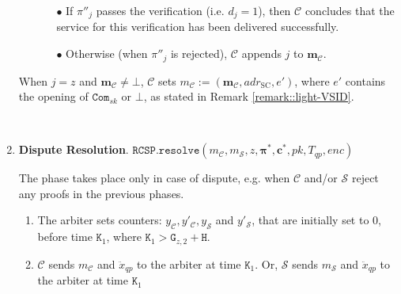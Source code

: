 \begin{enumerate}
\begin{enumerate}
\begin{itemize}
\item[$\bullet$] If $\pi''_{\scriptscriptstyle j}$ passes the verification (i.e. $d_{\scriptscriptstyle j}=1$), then $\mathcal C$ concludes that the service  for this verification has been delivered successfully. 

\item[$\bullet$]  Otherwise (when $\pi''_{\scriptscriptstyle j}$ is rejected), $\mathcal C$ appends $j$  to $\bm{m}_{\scriptscriptstyle\mathcal{C}}$. 


\end{itemize}
\end{enumerate}
When $j=z$  and $\bm{m}_{\scriptscriptstyle\mathcal{C}}\neq\bot$, $\mathcal C$ sets    ${m}_{\scriptscriptstyle\mathcal C}:=(\bm{m}_{\scriptscriptstyle\mathcal{C}},adr_{\scriptscriptstyle \text{SC}},e')$, where  $e'$  contains the opening of $\mathtt{Com}_{\scriptscriptstyle sk}$ or  $\bot$, as stated in Remark \ref{remark::light-VSID}.




\

\item \textbf{Dispute Resolution}.\label{RCSP::Dispute-Resolution} $\mathtt{RCSP}.\mathtt{resolve}(m_{\scriptscriptstyle \mathcal{C}},m_{\scriptscriptstyle \mathcal{S}}, z, {\bm{\pi}}^{\scriptscriptstyle *}, {\bm{c}}^{\scriptscriptstyle *}, pk, T_{\scriptscriptstyle qp},enc)$



 The phase takes place only in  case of dispute, e.g. when $\mathcal C$ and/or $\mathcal S$ reject any proofs in the previous phases. %

\begin{enumerate}


\item The arbiter sets  counters: $y_{\scriptscriptstyle\mathcal C}, y'_{\scriptscriptstyle\mathcal C},y_{\scriptscriptstyle\mathcal S}$ and  $y'_{\scriptscriptstyle\mathcal S}$, that are initially set to $0$,  before time $\texttt{K}_{\scriptscriptstyle 1}$,  where $\texttt{K}_{\scriptscriptstyle 1}>\texttt{G}_{\scriptscriptstyle z,2}+\texttt{H}$. 
\item $\mathcal C$  sends $m_{\scriptscriptstyle\mathcal C}$ and $\ddot{x}_{\scriptscriptstyle qp}$ to the arbiter at time $\texttt{K}_{\scriptscriptstyle 1}$. Or,  $\mathcal S$ sends $m_{\scriptscriptstyle\mathcal S}$ and $\ddot{x}_{\scriptscriptstyle qp}$ to the arbiter at time $\texttt{K}_{\scriptscriptstyle 1}$ %


\end{enumerate}
\end{enumerate}
